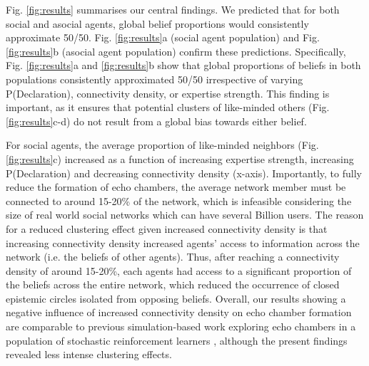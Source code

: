 \documentclass[fleqn,10pt]{wlscirep}
\begin{document}
Fig. \ref{fig:results} summarises our central findings. We predicted that for both social and asocial agents, global belief proportions would consistently approximate 50/50. Fig. \ref{fig:results}a (social agent population) and Fig. \ref{fig:results}b (asocial agent population) confirm these predictions. Specifically, Fig.  \ref{fig:results}a and \ref{fig:results}b show that global proportions of beliefs in both populations consistently approximated 50/50 irrespective of varying P(Declaration), connectivity density, or expertise strength. This finding is important, as it ensures that potential clusters of like-minded others (Fig. \ref{fig:results}c-d) do not result from a global bias towards either belief.

For social agents, the average proportion of like-minded neighbors (Fig. \ref{fig:results}c) increased as a function of increasing expertise strength, increasing P(Declaration) and decreasing connectivity density (x-axis). Importantly, to fully reduce the formation of echo chambers, the average network member must be connected to around 15-20\% of the network, which is infeasible considering the size of real world social networks which can have several Billion users. The reason for a reduced clustering effect given increased connectivity density is that increasing connectivity density increased agents' access to information across the network (i.e. the beliefs of other agents). Thus, after reaching a connectivity density of around 15-20\%, each agents had access to a significant proportion of the beliefs across the entire network, which reduced the occurrence of closed epistemic circles isolated from opposing beliefs. Overall, our results showing a negative influence of increased connectivity density on echo chamber formation are comparable to previous simulation-based work exploring echo chambers in a population of stochastic reinforcement learners \cite{pilditch2017opinion}, although the present findings revealed less intense clustering effects. 
\end{document}
